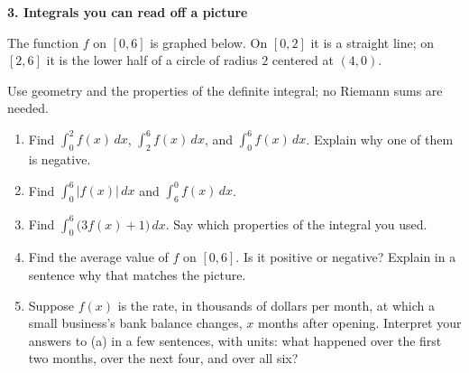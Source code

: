 \documentclass[11pt]{article}
\newcommand{\gridxy}[4]{%
  \foreach \gX in {#1,...,#2} \draw[gray!25] (\gX,#3) -- (\gX,#4);
  \foreach \gY in {#3,...,#4} \draw[gray!25] (#1,\gY) -- (#2,\gY);}
\newcommand{\prob}[1]{\medskip\noindent\textbf{\large #1}\par\smallskip}
\begin{document}
\newpage
\prob{3. Integrals you can read off a picture}
The function $f$ on $[0,6]$ is graphed below. On $[0,2]$ it is a straight line; on $[2,6]$
it is the lower half of a circle of radius $2$ centered at $(4,0)$.
\smallskip
\begin{center}
\end{center}
Use geometry and the properties of the definite integral; no Riemann sums are needed.
\begin{enumerate}
\item Find $\displaystyle\int_0^2 f(x)\,dx$, $\displaystyle\int_2^6 f(x)\,dx$, and $\displaystyle\int_0^6 f(x)\,dx$. Explain why one of them is negative.

\item Find $\displaystyle\int_0^6 |f(x)|\,dx$ and $\displaystyle\int_6^0 f(x)\,dx$.

\item Find $\displaystyle\int_0^6 \big(3f(x)+1\big)\,dx$. Say which properties of the integral you used.

\item Find the average value of $f$ on $[0,6]$. Is it positive or negative? Explain in a sentence why that matches the picture.

\item Suppose $f(x)$ is the rate, in thousands of dollars per month, at which a small business's bank balance changes, $x$ months after opening. Interpret your answers to (a) in a few sentences, with units: what happened over the first two months, over the next four, and over all six?

\end{enumerate}
\end{document}
